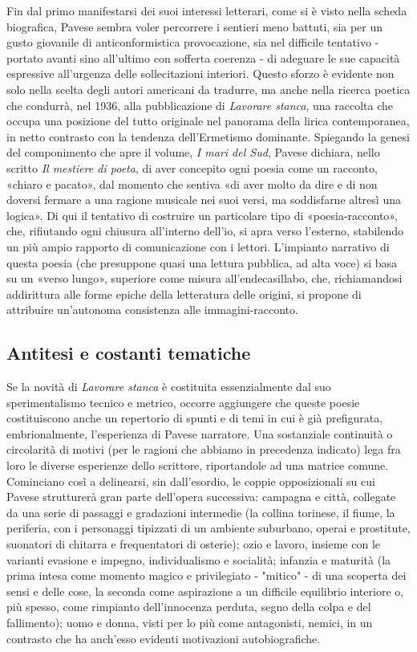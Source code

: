 \documentclass[a4paper, twoside, titlepage]{book}
\newcounter{mar}
\begin{document}
Fin dal primo manifestarsi dei suoi interessi letterari, come si è visto nella scheda biografica, Pavese sembra voler percorrere i sentieri meno battuti, sia per un gusto giovanile di anticonformistica provocazione, sia nel difficile tentativo - portato avanti sino all'ultimo con sofferta coerenza - di adeguare le sue capacità espressive all'urgenza delle sollecitazioni interiori. Questo sforzo è evidente non solo nella scelta degli autori americani da tradurre, ma anche nella ricerca poetica che condurrà, nel 1936, alla pubblicazione di \textit{Lavorare stanca}, una raccolta che occupa una posizione del tutto originale nel panorama della lirica contemporanea, in netto contrasto con la tendenza dell'Ermetismo dominante. Spiegando la genesi del componimento che apre il volume, \textit{I mari del Sud}, Pavese dichiara, nello scritto \textit{Il mestiere di poeta}, di aver concepito ogni poesia come un racconto, «chiaro e pacato», dal momento che sentiva «di aver molto da dire e di non doversi fermare a una ragione musicale nei suoi versi, ma soddisfarne altresì una logica». Di qui il tentativo di costruire un particolare tipo di «poesia-racconto», che, rifiutando ogni chiusura all'interno dell'io, si apra verso l'esterno, stabilendo un più ampio rapporto di comunicazione con i lettori. L'impianto narrativo di questa poesia (che presuppone quasi una lettura pubblica, ad alta voce) si basa su un «verso lungo», superiore come misura all'endecasillabo, che, richiamandosi addirittura alle forme epiche della letteratura delle origini, si propone di attribuire un'autonoma consistenza alle immagini-racconto.

\subsection{Antitesi e costanti tematiche}

Se la novità di \textit{Lavorare stanca} è costituita essenzialmente dal suo sperimentalismo tecnico e metrico, occorre aggiungere che queste poesie costituiscono anche un repertorio di spunti e di temi in cui è già prefigurata, embrionalmente, l'esperienza di Pavese narratore. Una sostanziale continuità o circolarità di motivi (per le ragioni che abbiamo in precedenza indicato) lega fra loro le diverse esperienze dello scrittore, riportandole ad una matrice comune. Cominciano così a delinearsi, sin dall'esordio, le coppie opposizionali su cui Pavese strutturerà gran parte dell'opera successiva: campagna e città, collegate da una serie di passaggi e gradazioni intermedie (la collina torinese, il fiume, la periferia, con i personaggi tipizzati di un ambiente suburbano, operai e prostitute, suonatori di chitarra e frequentatori di osterie); ozio e lavoro, insieme con le varianti evasione e impegno, individualismo e socialità; infanzia e maturità (la prima intesa come momento magico e privilegiato - "mitico" - di una scoperta dei sensi e delle cose, la seconda come aspirazione a un difficile equilibrio interiore o, più spesso, come rimpianto dell'innocenza perduta, segno della colpa e del fallimento); uomo e donna, visti per lo più come antagonisti, nemici, in un contrasto che ha anch'esso evidenti motivazioni autobiografiche.
\end{document}
